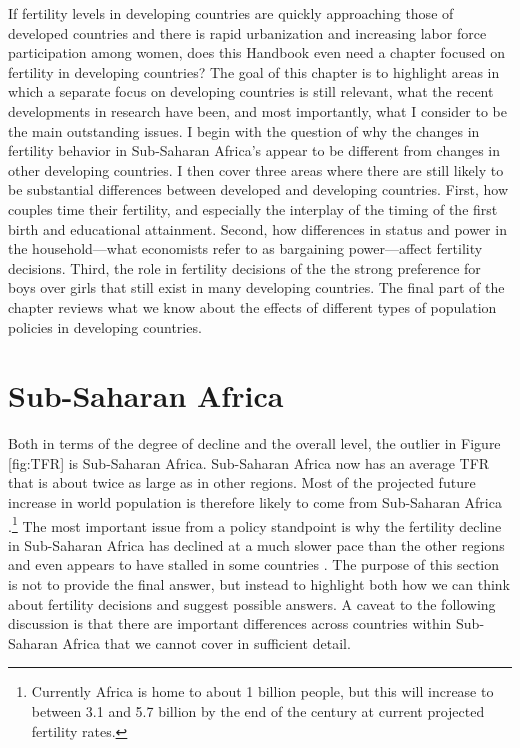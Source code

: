 If fertility levels in developing countries are quickly approaching those of developed countries and there is rapid urbanization and increasing labor force participation among women, does this Handbook even need a chapter focused on fertility in developing countries? The goal of this chapter is to highlight areas in which a separate focus on developing countries is still relevant, what the recent developments in research have been, and most importantly, what I consider to be the main outstanding issues. I begin with the question of why the changes in fertility behavior in Sub-Saharan Africa's appear to be different from changes in other developing countries. I then cover three areas where there are still likely to be substantial differences between developed and developing countries. First, how couples time their fertility, and especially the interplay of the timing of the first birth and educational attainment. Second, how differences in status and power in the household---what economists refer to as bargaining power---affect fertility decisions. Third, the role in fertility decisions of the the strong preference for boys over girls that still exist in many developing countries. The final part of the chapter reviews what we know about the effects of different types of population policies in developing countries.

\section{Sub-Saharan Africa}\label{sub-saharan-africa}

Both in terms of the degree of decline and the overall level, the outlier in Figure {[}fig:TFR{]} is Sub-Saharan Africa. Sub-Saharan Africa now has an average TFR that is about twice as large as in other regions. Most of the projected future increase in world population is therefore likely to come from Sub-Saharan Africa \citep{Gerland2014}.\footnote{Currently Africa is home to about 1 billion people, but this will increase to between 3.1 and 5.7 billion by the end of the century at current projected fertility rates.} The most important issue from a policy standpoint is why the fertility decline in Sub-Saharan Africa has declined at a much slower pace than the other regions and even appears to have stalled in some countries \citep{Ainsworth1996a,Singh2017}. The purpose of this section is not to provide the final answer, but instead to highlight both how we can think about fertility decisions and suggest possible answers. A caveat to the following discussion is that there are important differences across countries within Sub-Saharan Africa that we cannot cover in sufficient detail.

